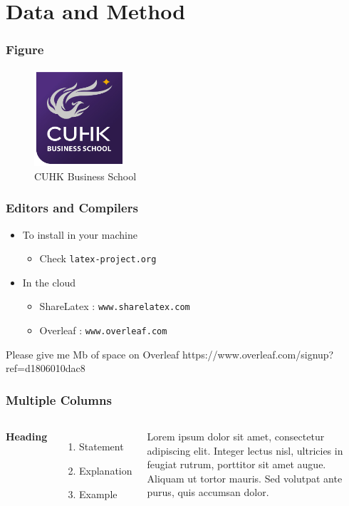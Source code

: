 \documentclass[10pt,aspectratio=32]{beamer}
\begin{document}
 
 
\section{Data and Method}

\begin{frame}
 \frametitle{Figure}
 \vspace{-0.3cm}
	\begin{figure}[h]
		\centering
		\includegraphics[width=0.3\textwidth]{cuba_logo}
		\caption{CUHK Business School}	
	\end{figure}
\end{frame}


\begin{frame}
	\frametitle{Editors and Compilers}
	\begin{itemize}
		\item To install in your machine
		\begin{itemize}
			\item Check \texttt{latex-project.org}
		\end{itemize}
		\item In the cloud
		\begin{itemize}
			\item ShareLatex : \texttt{www.sharelatex.com}
			\item Overleaf : \texttt{www.overleaf.com}
		\end{itemize}
	\end{itemize}
	\vskip 1cm
	\begin{block}{Please give me Mb of space on Overleaf}
		https://www.overleaf.com/signup?ref=d1806010dac8
	\end{block}
\end{frame}


\begin{frame}
	\frametitle{Multiple Columns}
	\begin{columns}[c] 
		\textbf{Heading}
		\begin{enumerate}
			\item Statement
			\item Explanation
			\item Example
		\end{enumerate}
		Lorem ipsum dolor sit amet, consectetur adipiscing elit. Integer lectus nisl, ultricies in feugiat rutrum, porttitor sit amet augue. Aliquam ut tortor mauris. Sed volutpat ante purus, quis accumsan dolor.
	\end{columns}
\end{frame}
\end{document}
